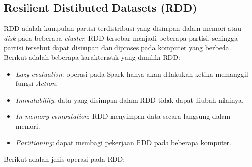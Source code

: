 \subsection{Resilient Distibuted Datasets (RDD)}
\label{sec:rdd}
\par RDD adalah kumpulan partisi terdistribusi yang disimpan dalam memori atau \textit{disk} pada beberapa \textit{cluster}. RDD tersebar menjadi beberapa partisi,  sehingga partisi tersebut dapat disimpan dan diproses pada komputer yang berbeda. \\

\noindent Berikut adalah beberapa karakteristik yang dimiliki RDD:

\begin{itemize}

\item \textit{Lazy evaluation}: operasi pada Spark hanya akan dilakukan ketika memanggil fungsi \textit{Action}.

\item \textit{Immutability}: data yang disimpan dalam RDD tidak dapat diubah nilainya. 

\item \textit{In-memory computation}: RDD menyimpan data secara langsung dalam memori.

\item \textit{Partitioning}: dapat membagi pekerjaan RDD pada beberapa komputer.

\end{itemize}

\noindent Berikut adalah jenis operasi pada RDD:

